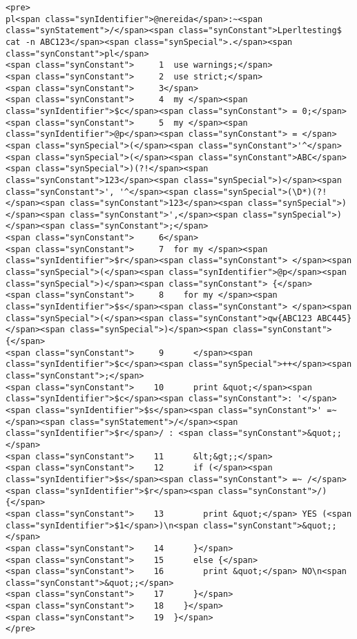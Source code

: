 \begin{exercise}
\begin{itemize}
\begin{verbatim}
<pre>
pl<span class="synIdentifier">@nereida</span>:~<span class="synStatement">/</span><span class="synConstant">Lperltesting$ cat -n ABC123</span><span class="synSpecial">.</span><span class="synConstant">pl</span>
<span class="synConstant">     1  use warnings;</span>
<span class="synConstant">     2  use strict;</span>
<span class="synConstant">     3</span>
<span class="synConstant">     4  my </span><span class="synIdentifier">$c</span><span class="synConstant"> = 0;</span>
<span class="synConstant">     5  my </span><span class="synIdentifier">@p</span><span class="synConstant"> = </span><span class="synSpecial">(</span><span class="synConstant">'^</span><span class="synSpecial">(</span><span class="synConstant">ABC</span><span class="synSpecial">)(?!</span><span class="synConstant">123</span><span class="synSpecial">)</span><span class="synConstant">', '^</span><span class="synSpecial">(\D*)(?!</span><span class="synConstant">123</span><span class="synSpecial">)</span><span class="synConstant">',</span><span class="synSpecial">)</span><span class="synConstant">;</span>
<span class="synConstant">     6</span>
<span class="synConstant">     7  for my </span><span class="synIdentifier">$r</span><span class="synConstant"> </span><span class="synSpecial">(</span><span class="synIdentifier">@p</span><span class="synSpecial">)</span><span class="synConstant"> {</span>
<span class="synConstant">     8    for my </span><span class="synIdentifier">$s</span><span class="synConstant"> </span><span class="synSpecial">(</span><span class="synConstant">qw{ABC123 ABC445}</span><span class="synSpecial">)</span><span class="synConstant"> {</span>
<span class="synConstant">     9      </span><span class="synIdentifier">$c</span><span class="synSpecial">++</span><span class="synConstant">;</span>
<span class="synConstant">    10      print &quot;</span><span class="synIdentifier">$c</span><span class="synConstant">: '</span><span class="synIdentifier">$s</span><span class="synConstant">' =~ </span><span class="synStatement">/</span><span class="synIdentifier">$r</span>/ : <span class="synConstant">&quot;;</span>
<span class="synConstant">    11      &lt;&gt;;</span>
<span class="synConstant">    12      if (</span><span class="synIdentifier">$s</span><span class="synConstant"> =~ /</span><span class="synIdentifier">$r</span><span class="synConstant">/) {</span>
<span class="synConstant">    13        print &quot;</span> YES (<span class="synIdentifier">$1</span>)\n<span class="synConstant">&quot;;</span>
<span class="synConstant">    14      }</span>
<span class="synConstant">    15      else {</span>
<span class="synConstant">    16        print &quot;</span> NO\n<span class="synConstant">&quot;;</span>
<span class="synConstant">    17      }</span>
<span class="synConstant">    18    }</span>
<span class="synConstant">    19  }</span>
</pre>


\end{verbatim}
\end{itemize}
\end{exercise}
